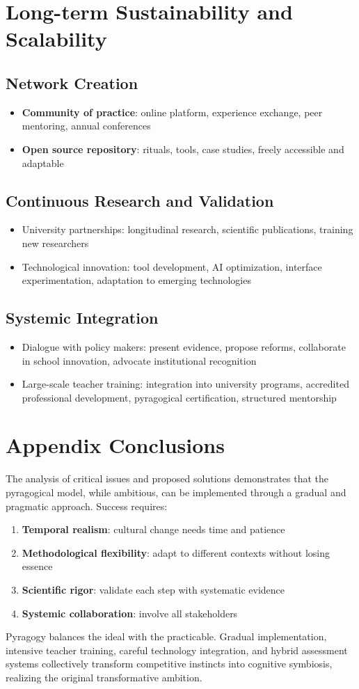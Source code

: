 \section{Long-term Sustainability and Scalability}

\subsection{Network Creation}
\begin{itemize}
	\item \textbf{Community of practice}: online platform, experience exchange, peer mentoring, annual conferences
	\item \textbf{Open source repository}: rituals, tools, case studies, freely accessible and adaptable
\end{itemize}

\subsection{Continuous Research and Validation}
\begin{itemize}
	\item University partnerships: longitudinal research, scientific publications, training new researchers
	\item Technological innovation: tool development, AI optimization, interface experimentation, adaptation to emerging technologies
\end{itemize}

\subsection{Systemic Integration}
\begin{itemize}
	\item Dialogue with policy makers: present evidence, propose reforms, collaborate in school innovation, advocate institutional recognition
	\item Large-scale teacher training: integration into university programs, accredited professional development, pyragogical certification, structured mentorship
\end{itemize}

\section{Appendix Conclusions}
The analysis of critical issues and proposed solutions demonstrates that the pyragogical model, while ambitious, can be implemented through a gradual and pragmatic approach. Success requires:
\begin{enumerate}
	\item \textbf{Temporal realism}: cultural change needs time and patience
	\item \textbf{Methodological flexibility}: adapt to different contexts without losing essence
	\item \textbf{Scientific rigor}: validate each step with systematic evidence
	\item \textbf{Systemic collaboration}: involve all stakeholders
\end{enumerate}

Pyragogy balances the ideal with the practicable. Gradual implementation, intensive teacher training, careful technology integration, and hybrid assessment systems collectively transform competitive instincts into cognitive symbiosis, realizing the original transformative ambition.
